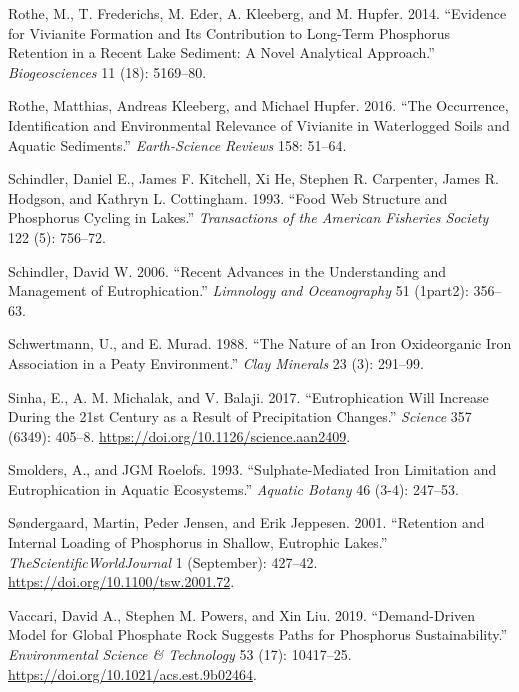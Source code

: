 \documentclass[a4paper,11pt]{article}
\newenvironment{CSLReferences}%
  {}%
  {\par}
\begin{document}
\begin{CSLReferences}{1}{0}
\leavevmode\hypertarget{ref-rotheEvidenceVivianiteFormation2014}{}%
Rothe, M., T. Frederichs, M. Eder, A. Kleeberg, and M. Hupfer. 2014. {``Evidence for Vivianite Formation and Its Contribution to Long-Term Phosphorus Retention in a Recent Lake Sediment: A Novel Analytical Approach.''} \emph{Biogeosciences} 11 (18): 5169--80.

\leavevmode\hypertarget{ref-rotheOccurrenceIdentificationEnvironmental2016}{}%
Rothe, Matthias, Andreas Kleeberg, and Michael Hupfer. 2016. {``The Occurrence, Identification and Environmental Relevance of Vivianite in Waterlogged Soils and Aquatic Sediments.''} \emph{Earth-Science Reviews} 158: 51--64.

\leavevmode\hypertarget{ref-schindlerFoodWebStructure1993}{}%
Schindler, Daniel E., James F. Kitchell, Xi He, Stephen R. Carpenter, James R. Hodgson, and Kathryn L. Cottingham. 1993. {``Food Web Structure and Phosphorus Cycling in Lakes.''} \emph{Transactions of the American Fisheries Society} 122 (5): 756--72.

\leavevmode\hypertarget{ref-schindlerRecentAdvancesUnderstanding2006}{}%
Schindler, David W. 2006. {``Recent Advances in the Understanding and Management of Eutrophication.''} \emph{Limnology and Oceanography} 51 (1part2): 356--63.

\leavevmode\hypertarget{ref-schwertmannNatureIronOxide1988}{}%
Schwertmann, U., and E. Murad. 1988. {``The Nature of an Iron Oxide{}organic Iron Association in a Peaty Environment.''} \emph{Clay Minerals} 23 (3): 291--99.

\leavevmode\hypertarget{ref-sinhaEutrophicationWillIncrease2017}{}%
Sinha, E., A. M. Michalak, and V. Balaji. 2017. {``Eutrophication Will Increase During the 21st Century as a Result of Precipitation Changes.''} \emph{Science} 357 (6349): 405--8. \url{https://doi.org/10.1126/science.aan2409}.

\leavevmode\hypertarget{ref-smoldersSulphatemediatedIronLimitation1993}{}%
Smolders, A., and JGM Roelofs. 1993. {``Sulphate-Mediated Iron Limitation and Eutrophication in Aquatic Ecosystems.''} \emph{Aquatic Botany} 46 (3-4): 247--53.

\leavevmode\hypertarget{ref-sondergaardRetentionInternalLoading2001}{}%
Søndergaard, Martin, Peder Jensen, and Erik Jeppesen. 2001. {``Retention and {Internal Loading} of {Phosphorus} in {Shallow}, {Eutrophic Lakes}.''} \emph{TheScientificWorldJournal} 1 (September): 427--42. \url{https://doi.org/10.1100/tsw.2001.72}.

\leavevmode\hypertarget{ref-vaccariDemandDrivenModelGlobal2019}{}%
Vaccari, David A., Stephen M. Powers, and Xin Liu. 2019. {``Demand-{Driven Model} for {Global Phosphate Rock Suggests Paths} for {Phosphorus Sustainability}.''} \emph{Environmental Science \& Technology} 53 (17): 10417--25. \url{https://doi.org/10.1021/acs.est.9b02464}.


\end{CSLReferences}
\end{document}
